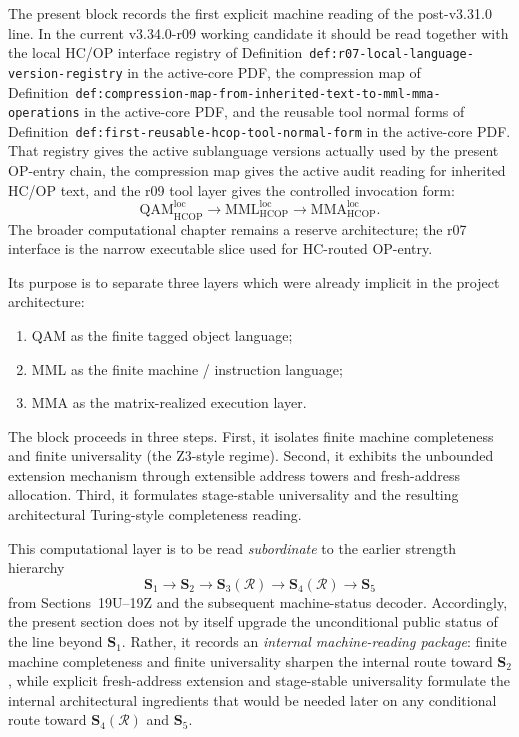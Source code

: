 The present block records the first explicit machine reading of the post-v3.31.0 line.  
In the current v3.34.0-r09 working candidate it should be read together with the local HC/OP interface registry of Definition~\texttt{def:r07-local-language-version-registry} in the active-core PDF, the compression map of Definition~\texttt{def:compression-map-from-inherited-text-to-mml-mma-operations} in the active-core PDF, and the reusable tool normal forms of Definition~\texttt{def:first-reusable-hcop-tool-normal-form} in the active-core PDF. That registry gives the active sublanguage versions actually used by the present OP-entry chain, the compression map gives the active audit reading for inherited HC/OP text, and the r09 tool layer gives the controlled invocation form:
\[
  \mathrm{QAM}_{\mathrm{HCOP}}^{\mathrm{loc}}
  \to
  \mathrm{MML}_{\mathrm{HCOP}}^{\mathrm{loc}}
  \to
  \mathrm{MMA}_{\mathrm{HCOP}}^{\mathrm{loc}}.
\]
The broader computational chapter remains a reserve architecture; the r07 interface is the narrow executable slice used for HC-routed OP-entry.

Its purpose is to separate three layers which were already implicit in the project architecture:
\begin{enumerate}[leftmargin=2em]
  \item QAM as the finite tagged object language;
  \item MML as the finite machine / instruction language;
  \item MMA as the matrix-realized execution layer.
\end{enumerate}

The block proceeds in three steps. First, it isolates finite machine completeness and finite universality (the Z3-style regime). Second, it exhibits the unbounded extension mechanism through extensible address towers and fresh-address allocation. Third, it formulates stage-stable universality and the resulting architectural Turing-style completeness reading.

This computational layer is to be read \emph{subordinate} to the earlier strength hierarchy
\[
\mathbf S_1\to \mathbf S_2\to \mathbf S_3(\mathcal R)\to \mathbf S_4(\mathcal R)\to \mathbf S_5
\]
from Sections~19U--19Z and the subsequent machine-status decoder. Accordingly, the present section does not by itself upgrade the unconditional public status of the line beyond \(\mathbf S_1\). Rather, it records an \emph{internal machine-reading package}: finite machine completeness and finite universality sharpen the internal route toward \(\mathbf S_2\), while explicit fresh-address extension and stage-stable universality formulate the internal architectural ingredients that would be needed later on any conditional route toward \(\mathbf S_4(\mathcal R)\) and \(\mathbf S_5\).

